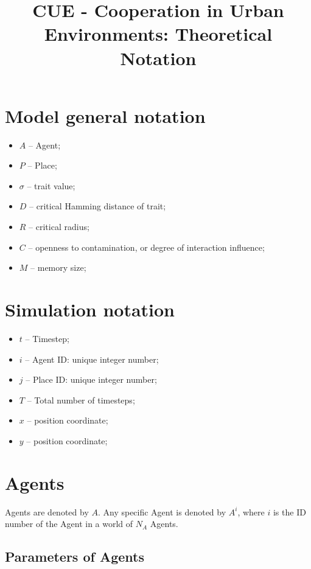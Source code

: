 \documentclass{article}
\title{CUE - Cooperation in Urban Environments: Theoretical Notation}
\author{}
\begin{document}
\maketitle

\section{Model general notation}

\begin{itemize}
    \item $A$ -- Agent;
    \item $P$ -- Place;
    \item $\sigma$ -- trait value;
    \item $D$ -- critical Hamming distance of trait;
    \item $R$ -- critical radius;
    \item $C$ -- openness to contamination, or degree of interaction influence;
    \item $M$ -- memory size;

\end{itemize}

\section{Simulation notation}

\begin{itemize}
    \item $t$ -- Timestep;
    \item $i$ -- Agent ID: unique integer number;
    \item $j$ -- Place ID: unique integer number;
    \item $T$ -- Total number of timesteps;
    \item $x$ -- position coordinate;
    \item $y$ -- position coordinate;
\end{itemize}

\section{Agents}

\par Agents are denoted by $A$. Any specific Agent is denoted by $A^{i}$, where $i$ is the ID number of the Agent in a world of $N_A$ Agents.

\subsection{Parameters of Agents}
\end{document}

